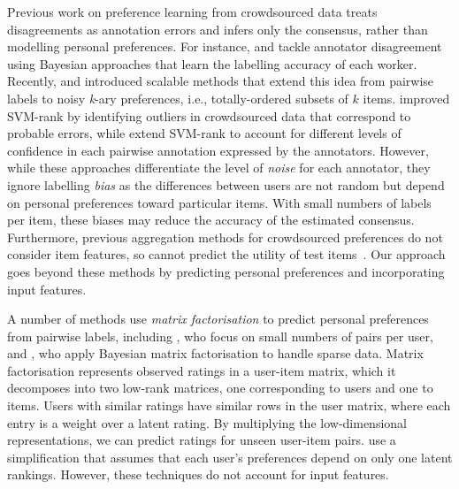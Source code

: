 Previous work on preference learning from crowdsourced data 
treats disagreements as annotation errors and infers only the consensus,
rather than modelling personal preferences.
For instance, 
\citet{chen2013pairwise} and \citet{wang2016blind} 
tackle annotator disagreement %
using Bayesian approaches that learn the labelling accuracy of each worker.
Recently, \citet{pan2018stagewise} and \citet{han2018robust} 
introduced scalable methods that extend this idea from pairwise labels
to noisy \textit{k}-ary preferences,
i.e., totally-ordered subsets of $k$ items.
\citet{fu2016robust} improved SVM-rank by identifying outliers in crowdsourced data
that correspond to probable errors,
while \citet{uchida2017entity} extend SVM-rank to account for different levels of confidence in each pairwise annotation expressed by the annotators.
However, while these approaches differentiate the level of \emph{noise}
for each annotator,
they ignore labelling \emph{bias} 
as the differences between users are not random but depend on personal preferences toward particular items.
With small numbers of labels per item, these biases may reduce the accuracy of the estimated
consensus.
Furthermore, previous aggregation methods for crowdsourced preferences
do not consider item features,
so cannot predict the utility of test items~\citep{chen2013pairwise,wang2016blind,han2018robust,pan2018stagewise,li2018hybrid}.
Our approach goes beyond these methods
by predicting personal preferences
and incorporating input features.

A number of methods use \emph{matrix factorisation} to predict personal preferences 
from pairwise labels, including 
\citet{yi_inferring_2013}, who focus on small numbers of pairs per user,
and \citet{salimans2012collaborative}, who apply Bayesian matrix factorisation to 
handle sparse data.
Matrix factorisation represents observed ratings in a user-item matrix,
which it decomposes into two low-rank matrices, one corresponding to users and one to items.
Users with similar ratings have similar rows in the user
matrix, where each entry is a weight over a latent rating.
By multiplying the low-dimensional representations, we can predict ratings for unseen
user-item pairs. 
\citet{kim2014latent} use a simplification that assumes that
each user's preferences depend on only one latent rankings.
However, these techniques do not account for input features.

